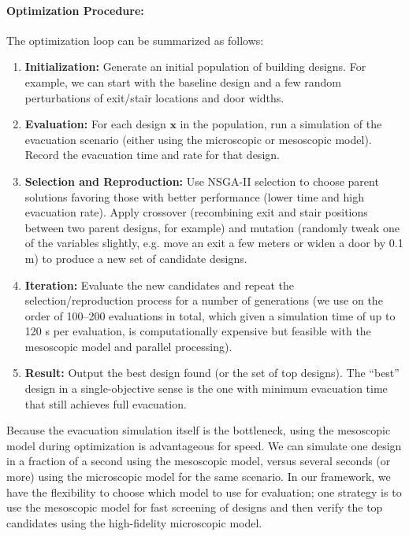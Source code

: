 \documentclass[11pt,a4paper]{article}
\begin{document}
\paragraph{Optimization Procedure:} The optimization loop can be summarized as follows:
\begin{enumerate}
    \item \textbf{Initialization:} Generate an initial population of building designs. For example, we can start with the baseline design and a few random perturbations of exit/stair locations and door widths.
    \item \textbf{Evaluation:} For each design $\mathbf{x}$ in the population, run a simulation of the evacuation scenario (either using the microscopic or mesoscopic model). Record the evacuation time and rate for that design.
    \item \textbf{Selection and Reproduction:} Use NSGA-II selection to choose parent solutions favoring those with better performance (lower time and high evacuation rate). Apply crossover (recombining exit and stair positions between two parent designs, for example) and mutation (randomly tweak one of the variables slightly, e.g. move an exit a few meters or widen a door by 0.1 m) to produce a new set of candidate designs.
    \item \textbf{Iteration:} Evaluate the new candidates and repeat the selection/reproduction process for a number of generations (we use on the order of 100--200 evaluations in total, which given a simulation time of up to 120 s per evaluation, is computationally expensive but feasible with the mesoscopic model and parallel processing).
    \item \textbf{Result:} Output the best design found (or the set of top designs). The ``best'' design in a single-objective sense is the one with minimum evacuation time that still achieves full evacuation.
\end{enumerate}

Because the evacuation simulation itself is the bottleneck, using the mesoscopic model during optimization is advantageous for speed. We can simulate one design in a fraction of a second using the mesoscopic model, versus several seconds (or more) using the microscopic model for the same scenario. In our framework, we have the flexibility to choose which model to use for evaluation; one strategy is to use the mesoscopic model for fast screening of designs and then verify the top candidates using the high-fidelity microscopic model.
\end{document}

